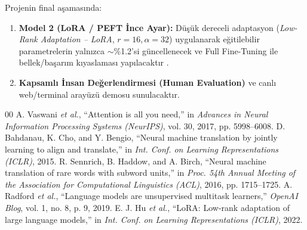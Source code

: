 \documentclass[conference]{IEEEtran}
\begin{document}
Projenin final aşamasında:
\begin{enumerate}
    \item \textbf{Model 2 (LoRA / PEFT İnce Ayar):} Düşük dereceli adaptasyon (\textit{Low-Rank Adaptation -- LoRA}, $r=16, \alpha=32$) uygulanarak eğitilebilir parametrelerin yalnızca $\sim$\%1.2'si güncellenecek ve Full Fine-Tuning ile bellek/başarım kıyaslaması yapılacaktır \cite{hu2022lora}.
    \item \textbf{Kapsamlı İnsan Değerlendirmesi (Human Evaluation)} ve canlı web/terminal arayüzü demosu sunulacaktır.
\end{enumerate}

\begin{thebibliography}{00}
 A. Vaswani \textit{et al.}, ``Attention is all you need,'' in \textit{Advances in Neural Information Processing Systems (NeurIPS)}, vol. 30, 2017, pp. 5998--6008.
 D. Bahdanau, K. Cho, and Y. Bengio, ``Neural machine translation by jointly learning to align and translate,'' in \textit{Int. Conf. on Learning Representations (ICLR)}, 2015.
 R. Sennrich, B. Haddow, and A. Birch, ``Neural machine translation of rare words with subword units,'' in \textit{Proc. 54th Annual Meeting of the Association for Computational Linguistics (ACL)}, 2016, pp. 1715--1725.
 A. Radford \textit{et al.}, ``Language models are unsupervised multitask learners,'' \textit{OpenAI Blog}, vol. 1, no. 8, p. 9, 2019.
 E. J. Hu \textit{et al.}, ``LoRA: Low-rank adaptation of large language models,'' in \textit{Int. Conf. on Learning Representations (ICLR)}, 2022.
\end{thebibliography}
\end{document}
